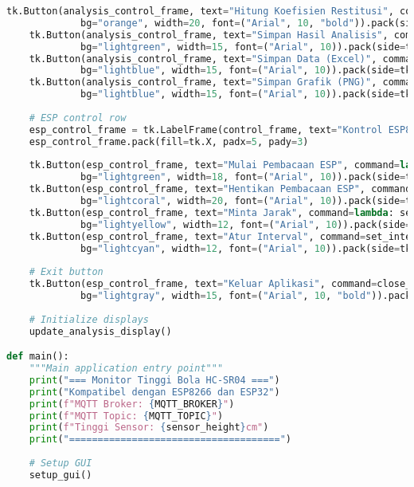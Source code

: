 \begin{itemize}
\begin{scriptsize}
\begin{lstlisting}[language=python]
    tk.Button(analysis_control_frame, text="Hitung Koefisien Restitusi", command=calculate_restitution_coefficient, 
             bg="orange", width=20, font=("Arial", 10, "bold")).pack(side=tk.LEFT, padx=3, pady=3)
    tk.Button(analysis_control_frame, text="Simpan Hasil Analisis", command=save_analysis_to_file, 
             bg="lightgreen", width=15, font=("Arial", 10)).pack(side=tk.LEFT, padx=3, pady=3)
    tk.Button(analysis_control_frame, text="Simpan Data (Excel)", command=save_excel, 
             bg="lightblue", width=15, font=("Arial", 10)).pack(side=tk.LEFT, padx=3, pady=3)
    tk.Button(analysis_control_frame, text="Simpan Grafik (PNG)", command=save_png, 
             bg="lightblue", width=15, font=("Arial", 10)).pack(side=tk.LEFT, padx=3, pady=3)
    
    # ESP control row
    esp_control_frame = tk.LabelFrame(control_frame, text="Kontrol ESP8266/ESP32", font=("Arial", 11, "bold"))
    esp_control_frame.pack(fill=tk.X, padx=5, pady=3)
    
    tk.Button(esp_control_frame, text="Mulai Pembacaan ESP", command=lambda: send_mqtt_command("START_READING"), 
             bg="lightgreen", width=18, font=("Arial", 10)).pack(side=tk.LEFT, padx=3, pady=3)
    tk.Button(esp_control_frame, text="Hentikan Pembacaan ESP", command=lambda: send_mqtt_command("STOP_READING"), 
             bg="lightcoral", width=20, font=("Arial", 10)).pack(side=tk.LEFT, padx=3, pady=3)
    tk.Button(esp_control_frame, text="Minta Jarak", command=lambda: send_mqtt_command("READ_DISTANCE"), 
             bg="lightyellow", width=12, font=("Arial", 10)).pack(side=tk.LEFT, padx=3, pady=3)
    tk.Button(esp_control_frame, text="Atur Interval", command=set_interval, 
             bg="lightcyan", width=12, font=("Arial", 10)).pack(side=tk.LEFT, padx=3, pady=3)
    
    # Exit button
    tk.Button(esp_control_frame, text="Keluar Aplikasi", command=close_app, 
             bg="lightgray", width=15, font=("Arial", 10, "bold")).pack(side=tk.RIGHT, padx=3, pady=3)
    
    # Initialize displays
    update_analysis_display()

def main():
    """Main application entry point"""
    print("=== Monitor Tinggi Bola HC-SR04 ===")
    print("Kompatibel dengan ESP8266 dan ESP32")
    print(f"MQTT Broker: {MQTT_BROKER}")
    print(f"MQTT Topic: {MQTT_TOPIC}")
    print(f"Tinggi Sensor: {sensor_height}cm")
    print("=====================================")
    
    # Setup GUI
    setup_gui()
    

\end{lstlisting}
\end{scriptsize}
\end{itemize}
